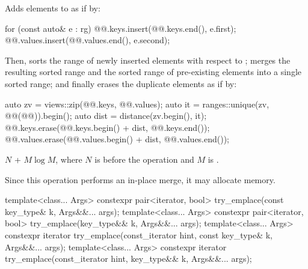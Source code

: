 \begin{itemdescr}
\pnum
\effects
Adds elements to  as if by:
\begin{codeblock}
for (const auto& e : rg) {
  @@.keys.insert(@@.keys.end(), e.first);
  @@.values.insert(@@.values.end(), e.second);
}
\end{codeblock}
Then, sorts the range of newly inserted elements
with respect to ;
merges the resulting sorted range and
the sorted range of pre-existing elements into a single sorted range; and
finally erases the duplicate elements as if by:
\begin{codeblock}
auto zv = views::zip(@@.keys, @@.values);
auto it = ranges::unique(zv, @@(@@)).begin();
auto dist = distance(zv.begin(), it);
@@.keys.erase(@@.keys.begin() + dist, @@.keys.end());
@@.values.erase(@@.values.begin() + dist, @@.values.end());
\end{codeblock}

\pnum
\complexity
$N$ + $M \log M$,
where $N$ is  before the operation and
$M$ is .

\pnum
\remarks
Since this operation performs an in-place merge, it may allocate memory.
\end{itemdescr}

%
\begin{itemdecl}
template<class... Args>
  constexpr pair<iterator, bool> try_emplace(const key_type& k, Args&&... args);
template<class... Args>
  constexpr pair<iterator, bool> try_emplace(key_type&& k, Args&&... args);
template<class... Args>
  constexpr iterator try_emplace(const_iterator hint, const key_type& k, Args&&... args);
template<class... Args>
  constexpr iterator try_emplace(const_iterator hint, key_type&& k, Args&&... args);
\end{itemdecl}

